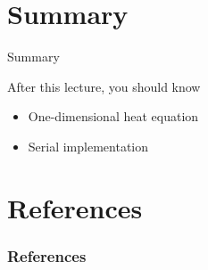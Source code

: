 \documentclass[12pt,t]{beamer}
\begin{document}
\section{Summary}
\begin{frame}{Summary}
\begin{block}{After this lecture, you should know}
\begin{itemize}
\item One-dimensional heat equation
\item Serial implementation
\end{itemize}
\end{block}
\end{frame}


\section{References}

\begin{frame}[t, allowframebreaks]
\frametitle{References}


\end{frame}
\end{document}
